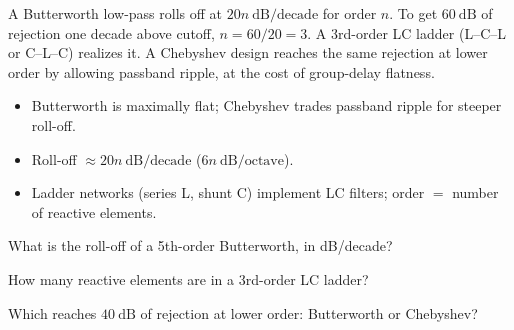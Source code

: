 \begin{workedexample}
A Butterworth low-pass rolls off at $20n\ \text{dB/decade}$ for order $n$.
To get $60\ \text{dB}$ of rejection one decade above cutoff,
$n = 60/20 = 3$. A 3rd-order LC ladder (L--C--L or C--L--C) realizes it. A
Chebyshev design reaches the same rejection at lower order by allowing passband
ripple, at the cost of group-delay flatness.
\end{workedexample}

\begin{keytakeaways}
\begin{itemize}[leftmargin=1.4em,itemsep=2pt]
\item Butterworth is maximally flat; Chebyshev trades passband ripple for steeper roll-off.
\item Roll-off $\approx 20n\ \text{dB/decade}$ ($6n\ \text{dB/octave}$).
\item Ladder networks (series L, shunt C) implement LC filters; order $=$ number of reactive elements.
\end{itemize}
\end{keytakeaways}

\begin{exercises}
\item What is the roll-off of a 5th-order Butterworth, in dB/decade?
\item How many reactive elements are in a 3rd-order LC ladder?
\item Which reaches $40\ \text{dB}$ of rejection at lower order: Butterworth or Chebyshev?
\end{exercises}

